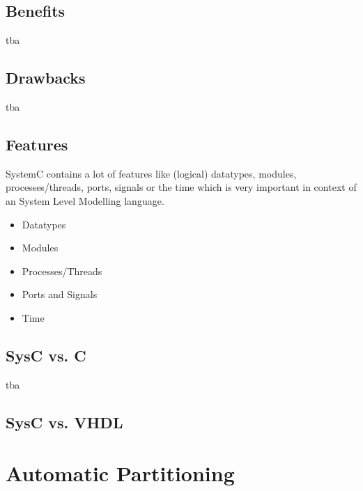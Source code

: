 \documentclass{article}
\begin{document}
	  \subsection{Benefits}
	  tba
	  \subsection{Drawbacks}
	  tba
	  \subsection{Features}
	  SystemC contains a lot of features like (logical) datatypes, modules, processes/threads, ports, signals or the time which is very important in context of an System Level Modelling language.
	   \begin{itemize}
 	    \item{Datatypes}
 	    \item{Modules}
 	    \item{Processes/Threads}
 	    \item{Ports and Signals}
  	    \item{Time}
	   \end{itemize}
	  \subsection{SysC vs. C}
	  tba
	  \subsection{SysC vs. VHDL}

	\section{Automatic Partitioning}
\end{document}
